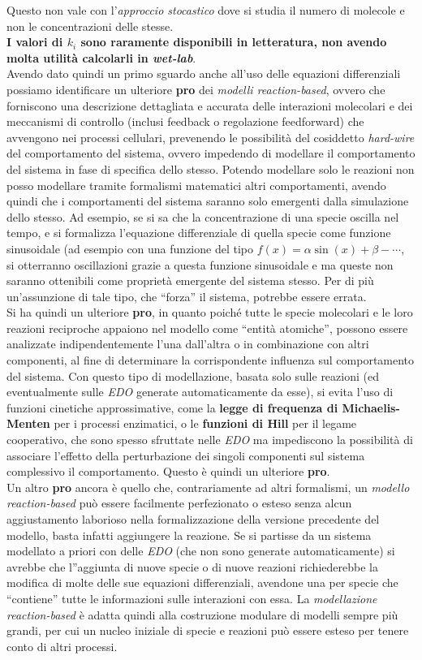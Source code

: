 \documentclass[a4paper,12pt, oneside]{book}
\begin{document}
Questo non vale con l'\textit{approccio stocastico} dove si studia il numero di
molecole e non le concentrazioni delle stesse.\\
\textbf{I valori di $k_i$ sono raramente disponibili in letteratura, non avendo
  molta utilità calcolarli in \textit{wet-lab}}.\\
Avendo dato quindi un primo sguardo anche all'uso delle equazioni differenziali
possiamo identificare un ulteriore \textbf{pro} dei \textit{modelli
  reaction-based}, ovvero che forniscono una descrizione dettagliata e accurata
delle interazioni molecolari e dei meccanismi di controllo (inclusi feedback o
regolazione feedforward) che avvengono nei processi cellulari, prevenendo le
possibilità del cosiddetto \textit{hard-wire} del comportamento del sistema,
ovvero impedendo di modellare il comportamento del sistema in fase di specifica
dello stesso. Potendo modellare solo le reazioni non posso modellare tramite
formalismi matematici altri comportamenti, avendo quindi che i comportamenti del
sistema saranno solo emergenti dalla simulazione dello stesso. Ad esempio, se
si sa che la concentrazione di una specie oscilla nel tempo, e si formalizza
l'equazione differenziale di quella specie come funzione sinusoidale (ad esempio
con una funzione del tipo $f(x)=\alpha\sin(x)+\beta-\cdots$, si
otterranno 
oscillazioni grazie a questa funzione sinusoidale e ma queste non saranno
ottenibili come proprietà emergente del sistema stesso. Per di più un'assunzione
di tale tipo, che ``forza'' il sistema, potrebbe essere errata.\\
Si ha quindi un ulteriore \textbf{pro}, in quanto poiché tutte le specie
molecolari e le loro reazioni reciproche appaiono nel modello come ``entità
atomiche'', possono essere analizzate indipendentemente l'una dall'altra o in
combinazione con altri componenti, al fine di determinare la corrispondente
influenza sul comportamento del sistema. Con questo tipo di modellazione, basata
solo sulle reazioni (ed eventualmente sulle \textit{EDO} generate
automaticamente da esse), si evita l'uso di funzioni cinetiche approssimative,
come la \textbf{legge di frequenza di Michaelis-Menten} per i processi
enzimatici, o le \textbf{funzioni di Hill} per il legame cooperativo, che sono
spesso sfruttate nelle \textit{EDO}
ma impediscono la possibilità di associare l'effetto della perturbazione dei
singoli componenti sul sistema complessivo il comportamento. Questo è quindi un
ulteriore \textbf{pro}.\\
Un altro \textbf{pro} ancora è quello che, contrariamente ad altri formalismi,
un \textit{modello reaction-based} può essere facilmente perfezionato o esteso
senza 
alcun aggiustamento laborioso nella formalizzazione della versione precedente
del modello, basta infatti aggiungere la reazione. Se si partisse da un sistema
modellato a priori con delle \textit{EDO} (che non sono generate
automaticamente) si avrebbe che l''aggiunta di nuove specie o di nuove reazioni
richiederebbe la modifica di molte delle sue equazioni differenziali, avendone
una per specie che ``contiene'' tutte le informazioni sulle interazioni con
essa. La \textit{modellazione reaction-based} è adatta quindi alla costruzione
modulare di modelli sempre più grandi, per cui un nucleo iniziale di specie e
reazioni può essere esteso per tenere conto di altri processi.
\end{document}
